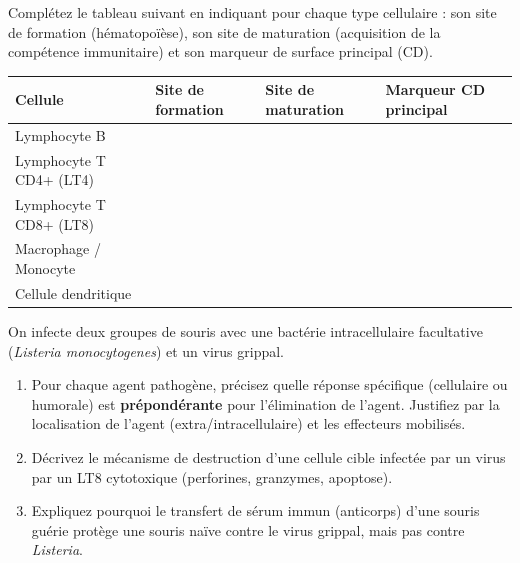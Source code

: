 \documentclass[11pt]{article}
\newcounter{popsec}
\newcounter{popsub}
\newcommand{\courssub}[1]{%
  \stepcounter{popsub}%
  \par\vspace{9pt}\noindent{\popxbold\fontsize{11.5}{13}\selectfont\color{popink}{\color{poporange}\thepopsec.\thepopsub}\hspace{6pt}#1}\par\nopagebreak\vspace{4pt}
}
\begin{document}
\courssub{Je m'entraîne}

\begin{exercice}
Complétez le tableau suivant en indiquant pour chaque type cellulaire : son site de formation (hématopoïèse), son site de maturation (acquisition de la compétence immunitaire) et son marqueur de surface principal (CD).
\begin{center}
\begin{tabularx}{\linewidth}{|l|X|X|X|}\hline
\textbf{Cellule} & \textbf{Site de formation} & \textbf{Site de maturation} & \textbf{Marqueur CD principal} \\ \hline
Lymphocyte B &  &  &  \\ \hline
Lymphocyte T CD4+ (LT4) &  &  &  \\ \hline
Lymphocyte T CD8+ (LT8) &  &  &  \\ \hline
Macrophage / Monocyte &  &  &  \\ \hline
Cellule dendritique &  &  &  \\ \hline
\end{tabularx}
\end{center}
\end{exercice}

\begin{exercice}
On infecte deux groupes de souris avec une bactérie intracellulaire facultative (\emph{Listeria monocytogenes}) et un virus grippal.
\begin{enumerate}
    \item Pour chaque agent pathogène, précisez quelle réponse spécifique (cellulaire ou humorale) est \textbf{prépondérante} pour l'élimination de l'agent. Justifiez par la localisation de l'agent (extra/intracellulaire) et les effecteurs mobilisés.
    \item Décrivez le mécanisme de destruction d'une cellule cible infectée par un virus par un LT8 cytotoxique (perforines, granzymes, apoptose).
    \item Expliquez pourquoi le transfert de sérum immun (anticorps) d'une souris guérie protège une souris naïve contre le virus grippal, mais pas contre \emph{Listeria}.
\end{enumerate}
\end{exercice}
\end{document}
